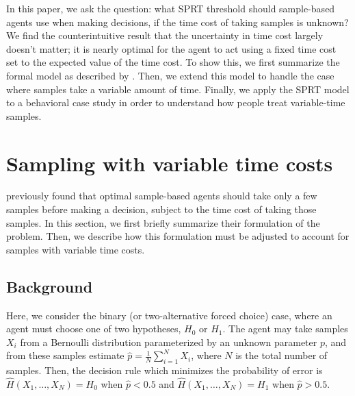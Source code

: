 \documentclass[11pt]{article}
\begin{document}
In this paper, we ask the question: what SPRT threshold should sample-based agents use when making decisions, if the time cost of taking samples is unknown? We find the counterintuitive result that the uncertainty in time cost largely doesn't matter; it is nearly optimal for the agent to act using a fixed time cost set to the expected value of the time cost. To show this, we first summarize the formal model as described by . Then, we extend this model to handle the case where samples take a variable amount of time. Finally, we apply the SPRT model to a behavioral case study in order to understand how people treat variable-time samples. 

\section{Sampling with variable time costs}

 previously found that optimal sample-based agents should take only a few samples before making a decision, subject to the time cost of taking those samples. In this section, we first briefly summarize their formulation of the problem. Then, we describe how this formulation must be adjusted to account for samples with variable time costs.

\subsection{Background}

Here, we consider the binary (or two-alternative forced choice) case, where an agent must choose one of two hypotheses, $H_0$ or $H_1$. The agent may take samples $X_i$ from a Bernoulli distribution parameterized by an unknown parameter $p$, and from these samples estimate $\hat{p}=\frac{1}{N}\sum_{i=1}^N X_i$, where $N$ is the total number of samples. Then, the decision rule which minimizes the probability of error is $\hat{H}(X_1,\ldots{},X_N)=H_0$ when $\hat{p}<0.5$ and $\hat{H}(X_1,\ldots{},X_N)=H_1$ when $\hat{p}>0.5$.
\end{document}
